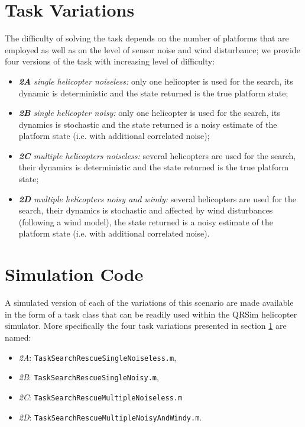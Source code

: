 \documentclass[a4paper,11pt]{report}
\newcommand{\sname}{QRSim\xspace}
\newcommand\mytexttt[1]{\texttt{\hyphenchar\font=45\relax #1}}
\begin{document}
\section{Task Variations} \label{SearchRescueVariations}
The difficulty of solving the task depends on the number of platforms that are employed as well as on the level of sensor noise and wind disturbance; we provide four versions of the task with increasing level of difficulty:
\begin{itemize}
 \item \textit{\textbf{2A} single helicopter noiseless:} only one helicopter is used for the search, its dynamic is deterministic and the state returned is the true platform state;
 \item \textit{\textbf{2B} single helicopter noisy:} only one helicopter is used for the search, its dynamics is stochastic and the state returned is a noisy estimate of the platform state (i.e. with additional correlated noise);
 \item \textit{\textbf{2C} multiple helicopters noiseless:} several helicopters are used for the search, their dynamics is deterministic and the state returned is the true platform state;
 \item \textit{\textbf{2D} multiple helicopters noisy and windy:} several helicopters are used for the search, their dynamics is stochastic and affected by wind disturbances (following a wind model), the state returned is a noisy estimate of the platform state (i.e. with additional correlated noise).
\end{itemize}

\section{Simulation Code} \label{SearchRescueSim}

A simulated version of each of the variations of this scenario are made available in the form of a task class that can be readily used within the \sname helicopter simulator. 
More specifically the four task variations presented in section \ref{SearchRescueVariations} are named:
\begin{itemize}
\item\textit{2A}: \mytexttt{TaskSearchRescueSingleNoiseless.m}, 
\item\textit{2B}: \mytexttt{TaskSearchRescueSingleNoisy.m}, 
\item\textit{2C}: \mytexttt{TaskSearchRescueMultipleNoiseless.m} 
\item\textit{2D}: \mytexttt{TaskSearchRescueMultipleNoisyAndWindy.m}. 
\end{itemize}
\end{document}
